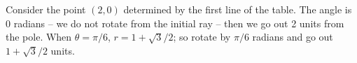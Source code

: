 {Consider the point $(2,0)$ determined by the first line of the table. The angle is 0 radians -- we do not rotate from the initial ray -- then we go out 2 units from the pole. When $\theta=\pi/6$, $r = 1+\sqrt{3}/2$; so rotate by $\pi/6$ radians and go out $1+\sqrt{3}/2$ units.}

%

